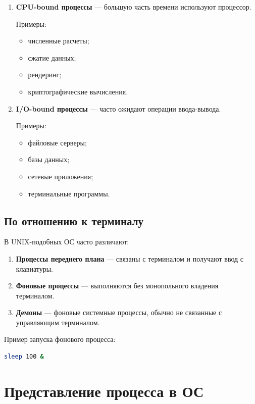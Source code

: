 \documentclass[12pt,a4paper]{article}
\begin{document}
\begin{enumerate}
    \item \textbf{CPU-bound процессы} --- большую часть времени используют процессор.

    Примеры:
    \begin{itemize}
        \item численные расчеты;
        \item сжатие данных;
        \item рендеринг;
        \item криптографические вычисления.
    \end{itemize}

    \item \textbf{I/O-bound процессы} --- часто ожидают операции ввода-вывода.

    Примеры:
    \begin{itemize}
        \item файловые серверы;
        \item базы данных;
        \item сетевые приложения;
        \item терминальные программы.
    \end{itemize}
\end{enumerate}

\subsection{По отношению к терминалу}

В UNIX-подобных ОС часто различают:

\begin{enumerate}
    \item \textbf{Процессы переднего плана} --- связаны с терминалом и получают ввод с клавиатуры.
    \item \textbf{Фоновые процессы} --- выполняются без монопольного владения терминалом.
    \item \textbf{Демоны} --- фоновые системные процессы, обычно не связанные с управляющим терминалом.
\end{enumerate}

Пример запуска фонового процесса:

\begin{lstlisting}[language=bash]
sleep 100 &
\end{lstlisting}

\section{Представление процесса в ОС}
\end{document}
